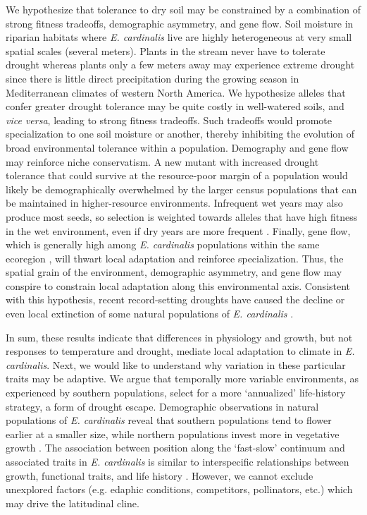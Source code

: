 \documentclass[11pt, oneside]{article}
\begin{document}
We hypothesize that tolerance to dry soil may be constrained by a combination of strong fitness tradeoffs, demographic asymmetry, and gene flow. Soil moisture in riparian habitats where \textit{E. cardinalis} live are highly heterogeneous at very small spatial scales (several meters). Plants in the stream never have to tolerate drought whereas plants only a few meters away may experience extreme drought since there is little direct precipitation during the growing season in Mediterranean climates of western North America. We hypothesize alleles that confer greater drought tolerance may be quite costly in well-watered soils, and \textit{vice versa}, leading to strong fitness tradeoffs. Such tradeoffs would promote specialization to one soil moisture or another, thereby inhibiting the evolution of broad environmental tolerance within a population. Demography and gene flow may reinforce niche conservatism. A new mutant with increased drought tolerance that could survive at the resource-poor margin of a population would likely be demographically overwhelmed by the larger census populations that can be maintained in higher-resource environments. Infrequent wet years may also produce most seeds, so selection is weighted towards alleles that have high fitness in the wet environment, even if dry years are more frequent \citep{Templeton_Levin_1979, Brown_Venable_1986}. Finally, gene flow, which is generally high among \textit{E. cardinalis} populations within the same ecoregion \citep{Paul_etal_2016}, will thwart local adaptation and reinforce specialization. Thus, the spatial grain of the environment, demographic asymmetry, and gene flow may conspire to constrain local adaptation along this environmental axis. Consistent with this hypothesis, recent record-setting droughts have caused the decline or even local extinction of some natural populations of \textit{E. cardinalis} \citep{Sheth_Angert_2017}.

In sum, these results indicate that differences in physiology and growth, but not responses to temperature and drought, mediate local adaptation to climate in \textit{E. cardinalis}. Next, we would like to understand why variation in these particular traits may be adaptive. We argue that temporally more variable environments, as experienced by southern populations, select for a more `annualized' life-history strategy, a form of drought escape. Demographic observations in natural populations of \textit{E. cardinalis} reveal that southern populations tend to flower earlier at a smaller size, while northern populations invest more in vegetative growth \citep{Sheth_Angert_2017}. The association between position along the `fast-slow' continuum and associated traits in \textit{E. cardinalis} is similar to interspecific relationships between growth, functional traits, and life history \citep{Adler_etal_2014, Salguero-Gomez_etal_2016}. However, we cannot exclude unexplored factors (e.g. edaphic conditions, competitors, pollinators, etc.) which may drive the latitudinal cline. 
\end{document}
